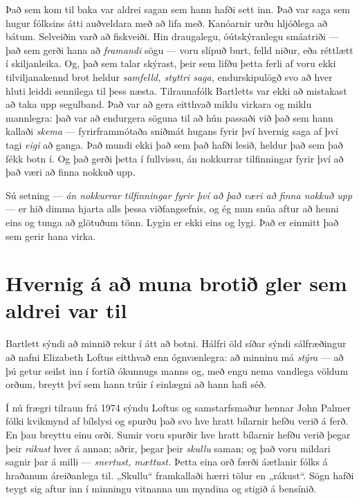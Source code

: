 Það sem kom til baka var aldrei sagan sem hann hafði sett inn. Það var saga sem hugur fólksins átti auðveldara með að lifa með. Kanóarnir urðu hljóðlega að bátum. Selveiðin varð að fiskveiði. Hin draugalegu, óútskýranlegu smáatriði — það sem gerði hana að \emph{framandi} sögu — voru slípuð burt, felld niður, eða réttlætt í skiljanleika. Og, það sem talar skýrast, þeir sem lifðu þetta ferli af voru ekki tilviljanakennd brot heldur \emph{samfelld, styttri saga,} endurskipulögð svo að hver hluti leiddi sennilega til þess næsta. Tilraunafólk Bartletts var ekki að mistakast að taka upp segulband. Það var að gera eitthvað miklu virkara og miklu mannlegra: það var að endurgera söguna til að hún passaði við það sem hann kallaði \emph{skema} — fyrirframmótaða sniðmát hugans fyrir því hvernig saga af því tagi \emph{eigi} að ganga. Það mundi ekki það sem það hafði lesið, heldur það sem það fékk botn í. Og það gerði þetta í fullvissu, án nokkurrar tilfinningar fyrir því að það væri að finna nokkuð upp.

Sú setning — \emph{án nokkurrar tilfinningar fyrir því að það væri að finna nokkuð upp} — er hið dimma hjarta alls þessa viðfangsefnis, og ég mun snúa aftur að henni eins og tunga að glötuðum tönn. Lygin er ekki eins og lygi. Það er einmitt það sem gerir hana virka.

\section*{Hvernig á að muna brotið gler sem aldrei var til}

Bartlett sýndi að minnið rekur í átt að botni. Hálfri öld síðar sýndi sálfræðingur að nafni Elizabeth Loftus eitthvað enn ógnvænlegra: að minninu má \emph{stýra} — að þú getur seilst inn í fortíð ókunnugs manns og, með engu nema vandlega völdum orðum, breytt því sem hann trúir í einlægni að hann hafi séð.

Í nú frægri tilraun frá 1974 sýndu Loftus og samstarfsmaður hennar John Palmer fólki kvikmynd af bílslysi og spurðu það svo hve hratt bílarnir hefðu verið á ferð. En þau breyttu einu orði. Sumir voru spurðir hve hratt bílarnir hefðu verið þegar þeir \emph{rákust} hver á annan; aðrir, þegar þeir \emph{skullu} saman; og það voru mildari sagnir þar á milli — \emph{snertust, mættust.} Þetta eina orð færði áætlanir fólks á hraðanum áreiðanlega til. „Skullu“ framkallaði hærri tölur en „rákust“. Sögn hafði teygt sig aftur inn í minningu vitnanna um myndina og stigið á bensínið.

